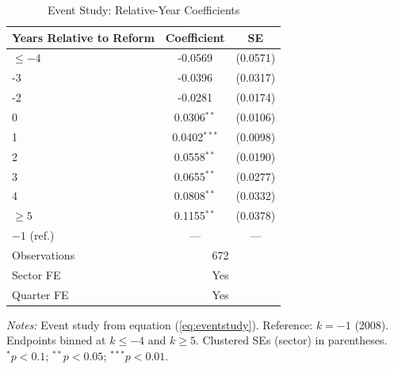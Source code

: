 \begin{table}[htbp]
\centering
\caption{Event Study: Relative-Year Coefficients}
\label{tab:eventstudy}
\begin{threeparttable}
\begin{tabular}{lcc}
\toprule
Years Relative to Reform & Coefficient & SE \\
\midrule
$\leq -4$ & -0.0569 & (0.0571) \\
-3 & -0.0396 & (0.0317) \\
-2 & -0.0281 & (0.0174) \\
0 & 0.0306$^{**}$ & (0.0106) \\
1 & 0.0402$^{***}$ & (0.0098) \\
2 & 0.0558$^{**}$ & (0.0190) \\
3 & 0.0655$^{**}$ & (0.0277) \\
4 & 0.0808$^{**}$ & (0.0332) \\
$\geq 5$ & 0.1155$^{**}$ & (0.0378) \\
$-1$ (ref.) & --- & --- \\
\midrule
Observations & \multicolumn{2}{c}{672} \\
Sector FE & \multicolumn{2}{c}{Yes} \\
Quarter FE & \multicolumn{2}{c}{Yes} \\
\bottomrule
\end{tabular}
\begin{tablenotes}[flushleft]\small
\item \textit{Notes:} Event study from equation (\ref{eq:eventstudy}). Reference: $k=-1$ (2008). Endpoints binned at $k\leq -4$ and $k\geq 5$. Clustered SEs (sector) in parentheses. $^{*}p<0.1$; $^{**}p<0.05$; $^{***}p<0.01$.
\end{tablenotes}
\end{threeparttable}
\end{table}
